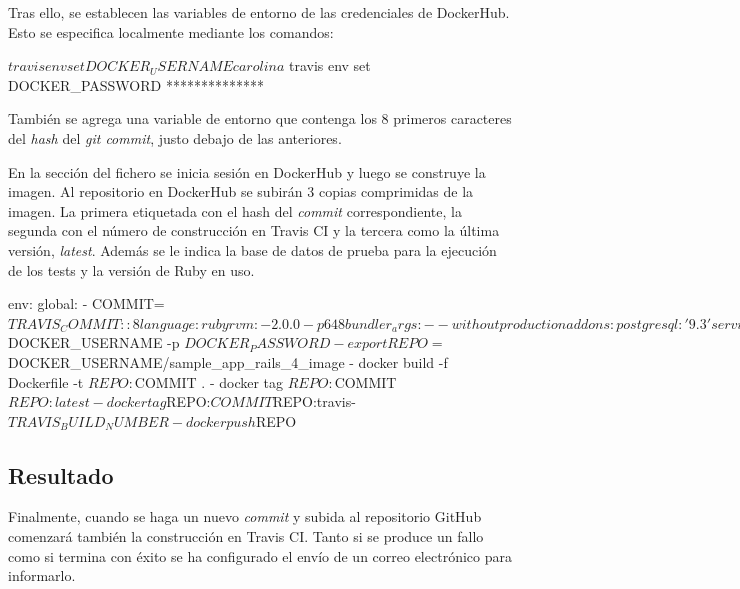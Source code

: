 Tras ello, se establecen las variables de entorno de las credenciales de DockerHub. Esto se especifica localmente mediante los comandos:

\begin{code}
$ travis env set DOCKER_USERNAME carolina
$ travis env set DOCKER_PASSWORD **************
\end{code}

También se agrega una variable de entorno que contenga los 8 primeros caracteres del \textit{hash} del \textit{git commit}, justo debajo de las anteriores.

En la sección  del fichero se inicia sesión en DockerHub y luego se construye la imagen. Al repositorio en DockerHub se subirán 3 copias comprimidas de la imagen. La primera etiquetada con el hash del \textit{commit} correspondiente, la segunda con el número de construcción en Travis CI y la tercera como la última versión, \textit{latest}. Además se le indica la base de datos de prueba para la ejecución de los tests y la versión de Ruby en uso.

\begin{codelisting}
\label{code:travis}
\begin{code}
env:
  global:
  - COMMIT=${TRAVIS_COMMIT::8}
language: ruby
rvm:
- 2.0.0-p648
bundler_args: --without production
addons:
  postgresql: '9.3'
services:
- docker
before_script:
- cp config/database.yml.travis config/database.yml
- psql -c 'create database travis_ci_test;' -U postgres
- RAILS_ENV=test bundle exec rake db:migrate --trace
script:
- bundle exec rspec
notifications:
  email:
    recipients:
    - c.santanamartel@gmail.com
    on_success: always
    on_failure: always
sudo: required
after_success:
- docker login -u $DOCKER_USERNAME -p $DOCKER_PASSWORD
- export REPO=$DOCKER_USERNAME/sample_app_rails_4_image
- docker build -f Dockerfile -t $REPO:$COMMIT .
- docker tag $REPO:$COMMIT $REPO:latest
- docker tag $REPO:$COMMIT $REPO:travis-$TRAVIS_BUILD_NUMBER
- docker push $REPO  
\end{code}
\end{codelisting}

\subsection{Resultado}

Finalmente, cuando se haga un nuevo \textit{commit} y subida al repositorio GitHub comenzará también la construcción en Travis CI. Tanto si se produce un fallo como si termina con éxito se ha configurado el envío de un correo electrónico para informarlo. 

